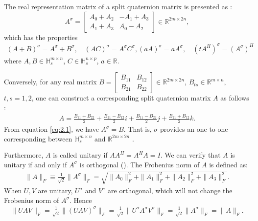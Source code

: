 \documentclass[1p]{elsarticle}
\numberwithin{equation}{section}
\begin{document}
The real representation matrix of a split quaternion matrix is presented as \cite{Gang2024}:
\begin{equation}\label{eq:2.1}
{A}^\sigma = \begin{bmatrix} A_0 + A_2 & -A_1 + A_3 \\ A_1 + A_3 & A_0 - A_2 \end{bmatrix} \in \mathbb{R}^{2m \times 2n},
\end{equation}
which has the properties
\begin{equation}\label{eq:2.2}
\begin{aligned}
    (A + B)^\sigma = A^\sigma + B^\sigma, \quad (AC)^\sigma = A^\sigma C^\sigma, 
    (a A)^\sigma = a A^\sigma, \quad (tA^H)^\sigma = (A^\sigma)^H
\end{aligned}
\end{equation}
where $A, B \in \mathbb{H}_s^{m \times n}$, $C \in \mathbb{H}_s^{n \times p}$, $a \in \mathbb{R}$. 

Conversely, for any real matrix $B = \begin{bmatrix} B_{11} & B_{12} \\ B_{21} & B_{22} \end{bmatrix} \in \mathbb{R}^{2m \times 2n}$, $B_{ts} \in \mathbb{R}^{m \times n}$, $t, s = 1, 2$, one can construct a corresponding split quaternion matrix $A$ as follows \cite{TJiang2015}:
\begin{equation}\label{eq:2.3}
    \begin{aligned}
    A = \frac{B_{11} + B_{22}}{2} + \frac{B_{21} - B_{12}}{2}i 
        + \frac{B_{11} - B_{22}}{2}j + \frac{B_{21} + B_{12}}{2}k.
    \end{aligned}
    \end{equation}
From equation \eqref{eq:2.1}, we have ${A}^\sigma = B$. 
That is,  $\sigma$ provides an one-to-one corresponding between $\mathbb{H}_s^{m\times n}$ and $\mathbb{R}^{2m \times 2n}$ \cite{Gang2024}.

Furthermore,  $A$ is called unitary if $AA^H = A^H A = I$. We can verify that $A$ is unitary if and only if  $A^\sigma$ is  orthogonal (\cite{TJiang2018}).
 The Frobenius norm of $A$ is defined as: 
 \begin{align*}
     \| A \|_F \equiv \frac{1}{\sqrt{2}} \| A^\sigma \|_F = \sqrt{\| A_0 \|_F^2 + \| A_1 \|_F^2 + \| A_2 \|_F^2 + \| A_3 \|_F^2}.
\end{align*}
  When $U, V$ are unitary, $U^\sigma$ and $V^\sigma$ are orthogonal, which will not change the Frobenius norm  of $A^\sigma$. Hence
\begin{align*}
\|UAV\|_F = \frac{1}{\sqrt{2}} \|(UAV)^\sigma\|_F 
= \frac{1}{\sqrt{2}} \|U^\sigma A^\sigma V^\sigma\|_F 
= \frac{1}{\sqrt{2}} \|A^\sigma\|_F 
= \|A\|_F.
\end{align*}
\end{document}
